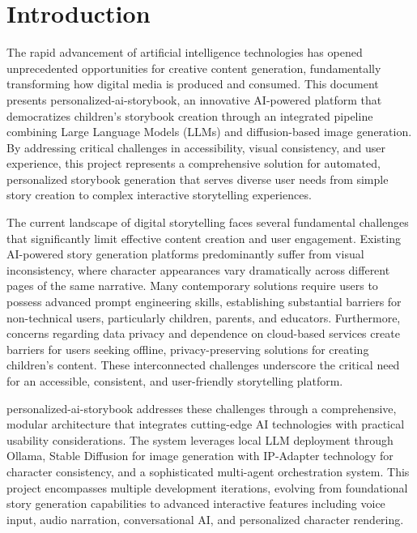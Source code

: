 \chapter{Introduction}
\label{sec:introduction}

The rapid advancement of artificial intelligence technologies has opened unprecedented opportunities for creative content generation, fundamentally transforming how digital media is produced and consumed. This document presents personalized-ai-storybook, an innovative AI-powered platform that democratizes children's storybook creation through an integrated pipeline combining Large Language Models (LLMs) and diffusion-based image generation. By addressing critical challenges in accessibility, visual consistency, and user experience, this project represents a comprehensive solution for automated, personalized storybook generation that serves diverse user needs from simple story creation to complex interactive storytelling experiences.

The current landscape of digital storytelling faces several fundamental challenges that significantly limit effective content creation and user engagement. Existing AI-powered story generation platforms predominantly suffer from visual inconsistency, where character appearances vary dramatically across different pages of the same narrative. Many contemporary solutions require users to possess advanced prompt engineering skills, establishing substantial barriers for non-technical users, particularly children, parents, and educators. Furthermore, concerns regarding data privacy and dependence on cloud-based services create barriers for users seeking offline, privacy-preserving solutions for creating children's content. These interconnected challenges underscore the critical need for an accessible, consistent, and user-friendly storytelling platform.

personalized-ai-storybook addresses these challenges through a comprehensive, modular architecture that integrates cutting-edge AI technologies with practical usability considerations. The system leverages local LLM deployment through Ollama, Stable Diffusion for image generation with IP-Adapter technology for character consistency, and a sophisticated multi-agent orchestration system. This project encompasses multiple development iterations, evolving from foundational story generation capabilities to advanced interactive features including voice input, audio narration, conversational AI, and personalized character rendering.

